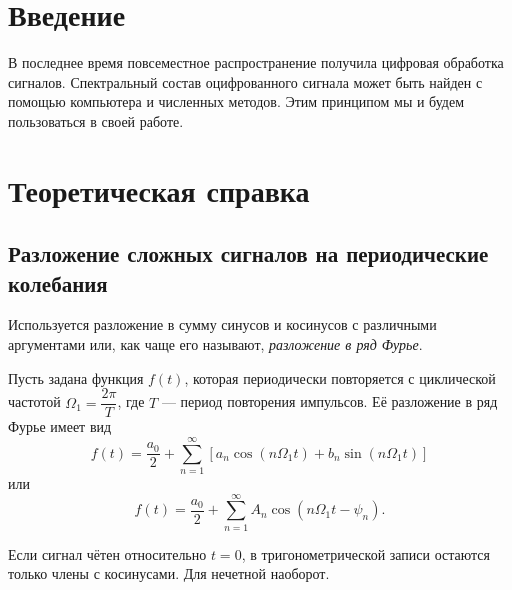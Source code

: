 

\newcommand{\artitle}{Спектральный анализ\\[9pt] электрических сигналов}

\newcommand{\arabstract}{В работе изучается спектральный состав периодических электрических сигналов различной формы: цугов, прямоугольных импульсов и модулированных по амплитуде сигналов; спектры этих сигналов наблюдаются на цифровом анализаторе спектра и сравниваются с рассчитанными теоретическими значениями.}





\section{Введение}
В последнее время повсеместное распространение получила цифровая обработка сигналов. Спектральный состав оцифрованного сигнала может быть найден с помощью компьютера и численных методов. Этим принципом мы и будем пользоваться в своей работе.

\section{Теоретическая справка}

\subsection*{Разложение сложных сигналов на периодические колебания}

Используется разложение в сумму синусов и косинусов с различными аргументами или, как чаще его называют, \textit{разложение в ряд Фурье}.

Пусть задана функция $f(t)$, которая периодически повторяется с циклической частотой $\Omega_1 = \dfrac{2\pi}{T}$, где $T$ --- период повторения импульсов. Её разложение в ряд Фурье имеет вид 
    \begin{equation}
    f(t) = \dfrac{a_0}{2} + \sum\limits_{n = 1}^{\infty}\left[a_n \cos \left(n \Omega_1t\right) + b_n \sin \left(n \Omega_1t\right)\right]
    \end{equation}
или
    \begin{equation}
    f(t) = \dfrac{a_0}{2} + \sum\limits_{n = 1}^{\infty}A_n \cos \left(n\Omega_1t-\psi_n\right).
    \end{equation}
    
Если сигнал чётен относительно $t=0$, в тригонометрической записи остаются только члены с косинусами. Для нечетной наоборот.

